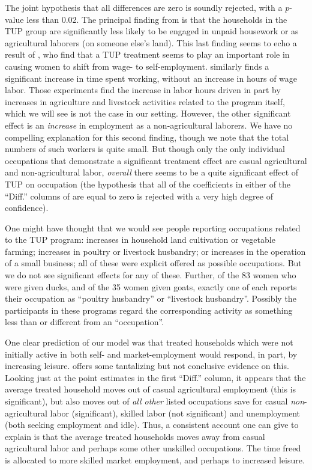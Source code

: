 \documentclass[12pt,letterpaper]{article}
\begin{document}
The joint hypothesis that all differences are zero is soundly
rejected, with a \(p\)-value less than 0.02.  The principal
finding from  is that the households in the TUP group
are significantly less likely to be engaged in unpaid housework or as
agricultural laborers (on someone else's land).  This last finding seems to
echo a result of \cite{bandiera-etal15}, who find that a TUP treatment
seems to play an important role in causing women to shift from wage-
to self-employment. \cite{Banerjee-etal15} similarly finds a significant increase in
time spent working, without an increase in hours of wage labor. Those experiments
find the increase in labor hours driven in part by increases in agriculture and
livestock activities related to the program itself, which we will see is not the case
in our setting. However, the other significant effect is an
\emph{increase} in employment as a non-agricultural laborers.  We have no
compelling explanation for this second finding, though we note that
the total numbers of such workers is quite small.  But though only the
only individual occupations that demonstrate a significant treatment
effect are casual agricultural and non-agricultural labor, \emph{overall}
there seems to be a quite significant effect of TUP on occupation (the
hypothesis that all of the coefficients in either of the ``Diff.''  columns of
 are equal to zero is rejected with a very high degree
of confidence).

One might have thought that we would see people reporting occupations
related to the TUP program: increases in household land cultivation or
vegetable farming; increases in poultry or livestock husbandry; or
increases in the operation of a small business; all of these were
explicit offered as possible occupations.  But we do not see
significant effects for any of these. Further, of the 83 women who were
given ducks, and of the 35 women given goats, exactly one of each
reports their occupation as ``poultry husbandry'' or ``livestock
husbandry''.  Possibly the participants in these programs regard 
the corresponding activity as something less than or different from an
``occupation''.

One clear prediction of our model was that treated households which
were not initially active in both self- and market-employment would
respond, in part, by increasing leisure.   offers some
tantalizing but not conclusive evidence on this.  Looking just at the
point estimates in the first ``Diff.'' column, it appears that the
average treated household moves out of casual agricultural employment
(this is significant), but also moves out of \emph{all other} listed
occupations save for casual \emph{non}-agricultural labor (significant),
skilled labor (not significant) and unemployment (both seeking
employment and idle).  Thus, a consistent account one can give to explain
 is that the average treated households moves away
from casual agricultural labor and perhaps some other unskilled
occupations.  The time freed is allocated to more skilled market
employment, and perhaps to increased leisure.
\end{document}
